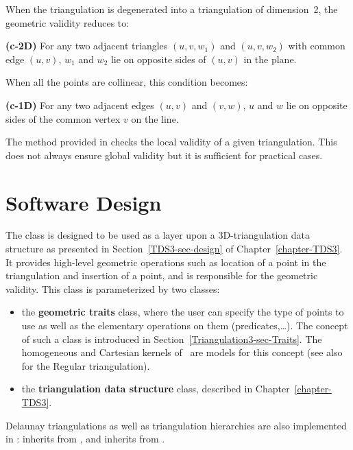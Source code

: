 When the triangulation is degenerated into a triangulation of
dimension~2, the  geometric validity reduces to:

{\bf (c-2D)} For any two adjacent triangles $(u,v,w_1)$ and $(u,v,w_2)$ with
common edge $(u,v)$, $w_1$ and $w_2$ lie on opposite sides of $(u,v)$
in the plane.

When all the points are collinear, this condition becomes:

{\bf (c-1D)} For any two adjacent edges $(u,v)$ and $(v,w)$, $u$ and
$w$ lie on opposite sides of the common vertex $v$ on the line.

The  method provided in  checks
the local validity of a given triangulation. This does not always
ensure global validity \cite{mnssssu-cgpvg-96,dlpt-ccpps-98} but it is 
sufficient for practical cases.

\section{Software Design}
\label{Triangulation3-sec-design}

The class  is
designed to be used as  
a layer upon a 3D-triangulation data structure as presented in 
Section~\ref{TDS3-sec-design} of Chapter~\ref{chapter-TDS3}.
It provides high-level geometric operations such as location of a point
in the triangulation and insertion of a point, and is responsible for
the geometric validity. This class is parameterized by two classes:
\begin{itemize}
\item {} the \textbf{geometric traits} class, where the user can
specify the type of points to use as well as the elementary
operations on them (predicates,\ldots). The concept of such a class is
introduced in Section~\ref{Triangulation3-sec-Traits}.  The homogeneous and Cartesian
kernels of \cgal\ are models for this concept
(see also  
for the Regular triangulation).
\item {} the \textbf{triangulation data structure} class, 
described in Chapter~\ref{chapter-TDS3}.
\end{itemize}	

Delaunay triangulations as well as triangulation hierarchies
\cite{d-iirdt-98} are also implemented in \cgal: 
inherits from  
, and 
 inherits from .

